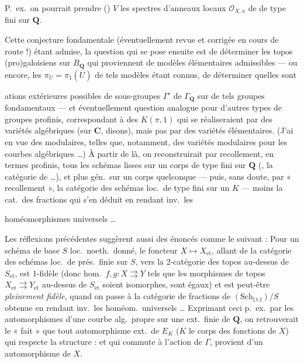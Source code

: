 \documentclass[11pt,a4paper]{article}
\begin{document}
P.~ex.\ on pourrait prendre ()
 $V$ les spectres d'anneaux locaux 
$\mathcal{O}_{X,x}$ de  de type fini sur $\mathbf{Q}$.

Cette conjecture fondamentale (éventuellement revue et corrigée en cours de
route !) étant admise, la question qui se pose ensuite est de déterminer les
topos (pro)galoisiens sur $B_{\mathbf{Q}}$ qui proviennent de modèles
élémentaires admissibles — ou encore, les $\pi_U = \pi_1(\overline{U})$ de tels
modèles étant connus, de déterminer quelles sont

ations extérieures possibles de sous-groupes 
$\Gamma'$ de $\Gamma_{\mathbf{Q}}$ sur de tels groupes fondamentaux — et
éventuellement question analogue pour d'autres types de groupes profinis,
correspondant à des $K(\pi,1)$ qui se réaliseraient par des variétés
algébriques (sur $\mathbf{C}$, disons), mais pas par des variétés élémentaires.
(J'ai en vue  des   modulaires,
telles que, notamment, des variétés modulaires pour les courbes algébriques …)
À partir de là, on reconstruirait par recollement, en termes profinis, tous les
schémas lisses sur un corps de type fini sur $\mathbf{Q}$ (, la catégorie de  …), et plus gén.\ sur un corps
quelconque — puis, sans doute, par « recollement », la catégorie des schémas
loc.\ de type fini sur un $K$ —  moins la cat.\ des
fractions qui s'en déduit en \struck{\ill{}} rendant inv.\ les

homéomorphismes universels …

Les réflexions précédentes suggèrent aussi des énoncés comme le suivant : Pour
un schéma de base $S$ loc.\ noeth.\ donné,
le foncteur $X \mapsto X_{\text{et}}$,
allant de la catégorie des schémas  loc.\ de prés.\
finie  sur $S$, vers la 2-catégorie des topos au-dessus de $S_{\text{et}}$, est
\struck{pleinement} 1-fidèle (donc hom.\ $f, g : X \rightrightarrows Y$ tels que
les morphismes de topos \add{$f_{\text{et}}, g_{\text{et}}$}
$X_{\text{et}} \rightrightarrows Y_{\text{et}}$ au-dessus de $S_{\text{et}}$ soient
isomorphes, sont égaux) et est peut-être \emph{pleinement fidèle}, quand on
passe à la catégorie de fractions de $(\mathrm{Sch}_{\text{l.t.f}})/S$ obtenue
en rendant inv.\ les homéom.\ universels …
Exprimant \struck{\ill{}} ceci p.~ex.\ par les automorphismes d'une courbe alg.\
propre sur une ext.\ finie de $\mathbf{Q}$, on retrouverait le « fait » que tout
automorphisme ext.\ de $E_K$ ($K$ le corps des fonctions de $X$) qui respecte la
structure : \ill{} et qui commute à l'action de $\Gamma$, provient d'un
automorphisme de $X$.
\end{document}
